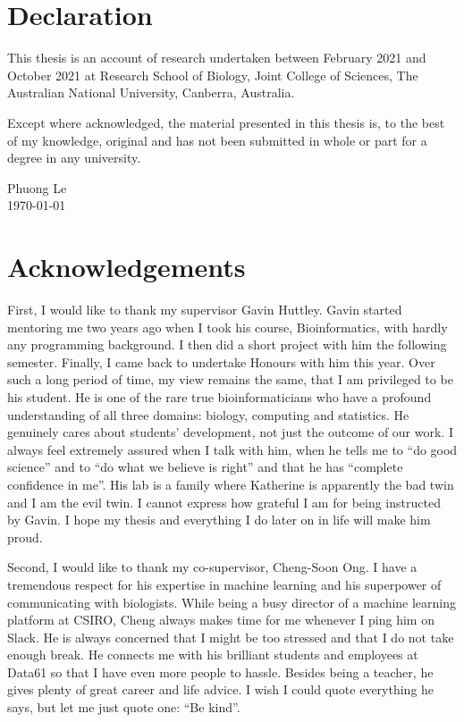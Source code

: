 
\chapter*{Declaration}





This thesis is an account of research undertaken between February 2021 and  October 2021 at Research School of Biology, Joint College of Sciences, The Australian National University, Canberra, Australia.

Except where acknowledged, the material presented in this thesis is, to the best of my knowledge, original and has not been submitted in whole or part for a degree in any university.

\vspace{20mm}  %

\large
\begin{flushright}
Phuong Le \\
\today
\end{flushright}

\normalsize
\chapter*{Acknowledgements}

First, I would like to thank my supervisor Gavin Huttley. Gavin started mentoring me two years ago when I took his course, Bioinformatics, with hardly any programming background. I then did a short project with him the following semester. Finally, I came back to undertake Honours with him this year. Over such a long period of time, my view remains the same, that I am privileged to be his student. He is one of the rare true bioinformaticians who have a profound understanding of all three domains: biology, computing and statistics. He genuinely cares about students' development, not just the outcome of our work. I always feel extremely assured when I talk with him, when he tells me to ``do good science'' and to ``do what we believe is right'' and that he has ``complete confidence in me''. His lab is a family where Katherine is apparently the bad twin and I am the evil twin. I cannot express how grateful I am for being instructed by Gavin. I hope my thesis and everything I do later on in life will make him proud.

Second, I would like to thank my co-supervisor, Cheng-Soon Ong. I have a tremendous respect for his expertise in machine learning and his superpower of communicating with biologists. While being a busy director of a machine learning platform at CSIRO, Cheng always makes time for me whenever I ping him on Slack. He is always concerned that I might be too stressed and that I do not take enough break. He connects me with his brilliant students and employees at Data61 so that I have even more people to hassle. Besides being a teacher, he gives plenty of great career and life advice. I wish I could quote everything he says, but let me just quote one: ``Be kind''.

